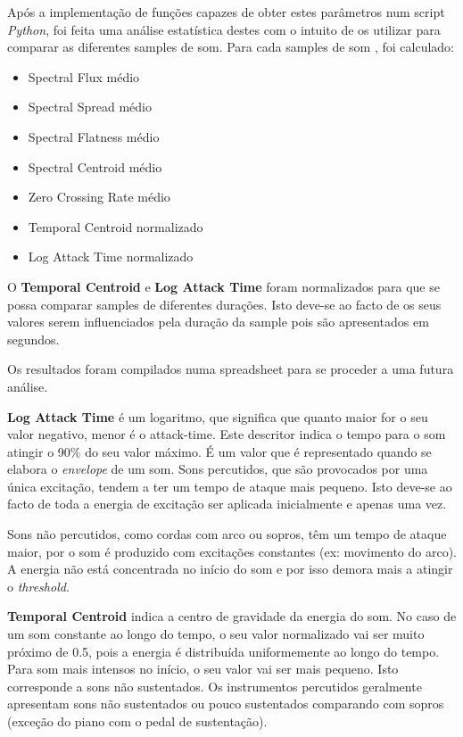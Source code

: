 Após a implementação de funções capazes de obter estes parâmetros num script \textit{Python}, foi feita uma análise estatística destes com o intuito de os utilizar para comparar as diferentes samples de som.
Para cada samples de som , foi calculado:
\begin{itemize}
    \item Spectral Flux médio
    \item Spectral Spread médio
    \item Spectral Flatness médio
    \item Spectral Centroid médio
    \item Zero Crossing Rate médio
    \item Temporal Centroid normalizado
    \item Log Attack Time normalizado
\end{itemize}

O \textbf{Temporal Centroid} e \textbf{Log Attack Time} foram normalizados para que se possa comparar samples de diferentes durações.
Isto deve-se ao facto de os seus valores serem influenciados pela duração da sample pois são apresentados em segundos.

Os resultados foram compilados numa spreadsheet para se proceder a uma futura análise.

\textbf{Log Attack Time} é um logaritmo, que significa que quanto maior for o seu valor negativo, menor é o attack-time.
Este descritor indica o tempo para o som atingir o 90\% do seu valor máximo. É um valor que é representado quando se elabora o \textit{envelope} de um som.
Sons percutidos, que são provocados por uma única excitação, tendem a ter um tempo de ataque mais pequeno.
Isto deve-se ao facto de toda a energia de excitação ser aplicada inicialmente e apenas uma vez.

Sons não percutidos, como cordas com arco ou sopros, têm um tempo de ataque maior, por o som é produzido com excitações constantes (ex: movimento do arco).
A energia não está concentrada no início do som e por isso demora mais a atingir o \textit{threshold}.


\textbf{Temporal Centroid} indica a centro de gravidade da energia do som. \cite{temp_cent}
No caso de um som constante ao longo do tempo, o seu valor normalizado vai ser muito próximo de 0.5, pois a energia é distribuída uniformemente ao longo do tempo.
Para som mais intensos no início, o seu valor vai ser mais pequeno. Isto corresponde a sons não sustentados.
Os instrumentos percutidos geralmente apresentam sons não sustentados ou pouco sustentados comparando com sopros (exceção do piano com o pedal de sustentação).

